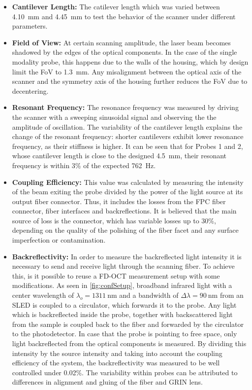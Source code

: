 \begin{itemize}


\item \textbf{Cantilever Length:} The catilever length which was varied between \SI{4.10}{\milli\meter} and \SI{4.45}{\milli\meter} to test the behavior of the scanner under different parameters. 

\item \textbf{Field of View:} At certain scanning amplitude, the laser beam becomes shadowed by the edges of the optical components. In the case of the single modality probe, this happens due to the walls of the housing, which by design limit the FoV to \SI{1.3}{\milli\meter}. Any misalignment between the optical axis of the scanner and the symmetry axis of the housing further reduces the FoV due to decentering.

\item \textbf{Resonant Frequency:} The resonance frequency was measured by driving the scanner with a sweeping sinusoidal signal and observing the  the amplitude of oscillation. The variability of the cantilever length explains the change of the resonant frequency: shorter cantilevers exhibit lower resonance frequency, as their stiffness is higher. It can be seen that for Probes 1 and 2, whose cantilever length is close to the designed \SI{4.5}{\milli\meter}, their resonant frequency is within 3\% of the expected \SI{762}{\hertz}. 

\item \textbf{Coupling Efficiency:} This value was calculated by measuring the intensity of the beam exiting the probe divided by the power of the light source at its output fiber connector. Thus, it includes the losses from the FPC fiber connector, fiber interfaces and backreflections. It is believed that the main source of loss is the connector, which has variable losses up to 30\%, depending on the quality of the polishing of the fiber facet and any surface imperfection or contamination. 

\item \textbf{Backreflectivity:} In order to measure the backreflected light intensity it is necessary to send and receive light through the scanning fiber. To achieve this, is it possible to reuse a FD-OCT measurement setup with some modifications. As seen in \autoref{fig:confSetup}, broadband infrared light with a center wavelength of $\lambda_o = \SI{1311}{\nano\meter}$ and a bandwidth of $\Delta \lambda = \SI{90}{\nano\meter} $ from an SLED is coupled to a circulator, which forwards it to the probe. Any light which is backreflected inside the probe, together with backscattered light from the sample is coupled back to the fiber and forwarded by the circulator to the photodetector. In case that the probe is pointing to free space, only light backreflected from the optical components is measured. By dividing this intensity by the source intensity and taking into account the coupling efficiency of the system, the backreflectivity was measured to be well controlled under 0.02\%. The variability within probes can be attributed to differences in alignment and gluing of the fiber and GRIN lens.

\end{itemize}

